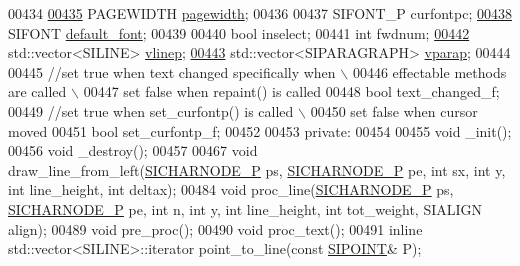 \begin{DoxyCode}
00434 
\hyperlink{class_s_i_t_e_x_t_afcb828b5d1da58d0f60088097e8c107b}{00435}     PAGEWIDTH \hyperlink{class_s_i_t_e_x_t_afcb828b5d1da58d0f60088097e8c107b}{pagewidth};   
00436 
00437     SIFONT\_P curfontpc; 
\hyperlink{class_s_i_t_e_x_t_abdacda1b7e48087a0aa2905702cb1d68}{00438}     SIFONT \hyperlink{class_s_i_t_e_x_t_abdacda1b7e48087a0aa2905702cb1d68}{default\_font};    
00439 
00440     \textcolor{keywordtype}{bool} inselect;  
00441     \textcolor{keywordtype}{int} fwdnum;
\hyperlink{class_s_i_t_e_x_t_abdabb47ab701f95f73b806df2c440347}{00442}     std::vector<SILINE> \hyperlink{class_s_i_t_e_x_t_abdabb47ab701f95f73b806df2c440347}{vlinep};   
\hyperlink{class_s_i_t_e_x_t_aeeeed4da4b7633b913a7a98336a91d75}{00443}     std::vector<SIPARAGRAPH> \hyperlink{class_s_i_t_e_x_t_aeeeed4da4b7633b913a7a98336a91d75}{vparap};  
00444 
00445     \textcolor{comment}{//set true when text changed specifically when \(\backslash\)}
00446 \textcolor{comment}{                effectable methods are called       \(\backslash\)}
00447 \textcolor{comment}{      set false when repaint() is called}
00448     \textcolor{keywordtype}{bool} text\_changed\_f;    
00449     \textcolor{comment}{//set true when set\_curfontp() is called \(\backslash\)}
00450 \textcolor{comment}{              set false when cursor moved}
00451     \textcolor{keywordtype}{bool} set\_curfontp\_f;
00452 
00453 \textcolor{keyword}{private}:
00454 
00455     \textcolor{keywordtype}{void} \_init();   
00456     \textcolor{keywordtype}{void} \_destroy();    
00457 
00467     \textcolor{keywordtype}{void} draw\_line\_from\_left(\hyperlink{class_s_i_c_h_a_r_n_o_d_e}{SICHARNODE\_P} ps, \hyperlink{class_s_i_c_h_a_r_n_o_d_e}{SICHARNODE\_P} pe, \textcolor{keywordtype}{int} sx, \textcolor{keywordtype}{int} y, \textcolor{keywordtype}{int} 
      line\_height, \textcolor{keywordtype}{int} deltax);
00484     \textcolor{keywordtype}{void} proc\_line(\hyperlink{class_s_i_c_h_a_r_n_o_d_e}{SICHARNODE\_P} ps, \hyperlink{class_s_i_c_h_a_r_n_o_d_e}{SICHARNODE\_P} pe, \textcolor{keywordtype}{int} n, \textcolor{keywordtype}{int} y, \textcolor{keywordtype}{int} line\_height,
       \textcolor{keywordtype}{int} tot\_weight, SIALIGN align);
00489     \textcolor{keywordtype}{void} pre\_proc();
00490     \textcolor{keywordtype}{void} proc\_text();   
00491     \textcolor{keyword}{inline} std::vector<SILINE>::iterator point\_to\_line(\textcolor{keyword}{const} \hyperlink{struct_s_i_p_o_i_n_t}{SIPOINT}& P);    

\end{DoxyCode}
